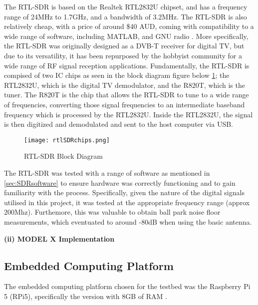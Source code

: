 The RTL-SDR is based on the Realtek RTL2832U chipset, and has a frequency range of 24MHz to 1.7GHz, and a bandwidth of 3.2MHz. The RTL-SDR is also relatively cheap, with a price of around \$40 AUD, coming with compatibility to a wide range of software, including MATLAB, and GNU radio \cite{SDRdongle}. More specifically, the RTL-SDR was originally designed as a DVB-T receiver for digital TV, but due to its versatility, it has been repurposed by the hobbyist community for a wide range of RF signal reception applications. Fundamentally, the RTL-SDR is compised of two IC chips as seen in the block diagram figure below \ref*{fig:rtlSDRblock}; the RTL2832U, which is the digital TV demodulator, and the R820T, which is the tuner. The R820T is the chip that allows the RTL-SDR to tune to a wide range of frequencies, converting those signal frequencies to an intermediate baseband frequency which is processed by the RTL2832U. Inside the RTL2832U, the signal is then digitized and demodulated and sent to the host computer via USB.

\begin{figure}[htbp]
    \centering
    \texttt{[image: rtlSDRchips.png]}
    \caption{RTL-SDR Block Diagram \cite{RTLsdrBlockDiagram}}
    \label{fig:rtlSDRblock}
\end{figure}

\par \noindent
The RTL-SDR was tested with a range of software as mentioned in \ref*{sec:SDRsoftware} to ensure hardware was correctly functioning and to gain familiarity with the process. Specifically, given the nature of the digital signals utilised in this project, it was tested at the appropriate frequency range (approx 200Mhz). Furthemore, this was valuable to obtain ball park noise floor measurements, which eventuated to around -80dB when using the basic antenna. 

\vspace{0.5cm} \noindent 
\textbf{(ii) MODEL X Implementation}



\subsection{Embedded Computing Platform \label{sec:embedded computing}}



The embedded computing platform chosen for the testbed was the Raspberry Pi 5 (RPi5), specifically the version with 8GB of RAM \cite{core_electronics_rpi5}. 


